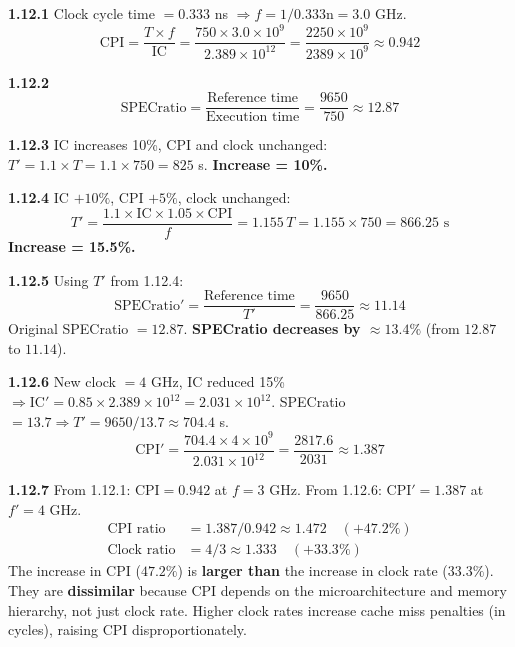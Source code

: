 \medskip\noindent\textbf{1.12.1}
Clock cycle time $= 0.333$ ns $\Rightarrow f = 1/0.333\text{n} = 3.0$ GHz.
\[
  \text{CPI} = \frac{T \times f}{\text{IC}}
  = \frac{750 \times 3.0 \times 10^9}{2.389 \times 10^{12}}
  = \frac{2250 \times 10^9}{2389 \times 10^9} \approx 0.942
\]

\noindent\textbf{1.12.2}
\[
  \text{SPECratio} = \frac{\text{Reference time}}{\text{Execution time}}
  = \frac{9650}{750} \approx 12.87
\]

\noindent\textbf{1.12.3}
IC increases 10\%, CPI and clock unchanged:
$T' = 1.1 \times T = 1.1 \times 750 = 825$ s.
\textbf{Increase = 10\%.}

\noindent\textbf{1.12.4}
IC $+10\%$, CPI $+5\%$, clock unchanged:
\[
  T' = \frac{1.1 \times \text{IC} \times 1.05 \times \text{CPI}}{f}
     = 1.155\,T = 1.155 \times 750 = 866.25\text{ s}
\]
\textbf{Increase = 15.5\%.}

\medskip\noindent\textbf{1.12.5}
Using $T'$ from 1.12.4:
\[
  \text{SPECratio}' = \frac{\text{Reference time}}{T'}
  = \frac{9650}{866.25} \approx 11.14
\]
Original SPECratio $= 12.87$.
\textbf{SPECratio decreases by $\approx 13.4\%$}
(from $12.87$ to $11.14$).

\medskip\noindent\textbf{1.12.6}
New clock $= 4$ GHz, IC reduced 15\% $\Rightarrow \text{IC}' = 0.85 \times
2.389 \times 10^{12} = 2.031 \times 10^{12}$.
SPECratio $= 13.7 \Rightarrow T' = 9650/13.7 \approx 704.4$ s.
\[
  \text{CPI}' = \frac{704.4 \times 4 \times 10^9}{2.031 \times 10^{12}}
  = \frac{2817.6}{2031} \approx 1.387
\]

\medskip\noindent\textbf{1.12.7}
From 1.12.1: $\text{CPI} = 0.942$ at $f = 3$ GHz.\quad
From 1.12.6: $\text{CPI}' = 1.387$ at $f' = 4$ GHz.
\begin{align*}
  \text{CPI ratio} &= 1.387/0.942 \approx 1.472 \quad (+47.2\%) \\
  \text{Clock ratio} &= 4/3 \approx 1.333 \quad (+33.3\%)
\end{align*}
The increase in CPI ($47.2\%$) is \textbf{larger than} the increase in
clock rate ($33.3\%$).  They are \textbf{dissimilar} because CPI depends
on the microarchitecture and memory hierarchy, not just clock rate.
Higher clock rates increase cache miss penalties (in cycles), raising
CPI disproportionately.

